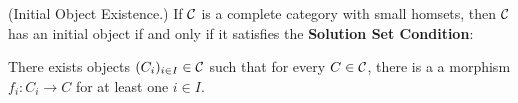     \begin{lemma}(Initial Object Existence.)
        If $\mathcal{C}$ is a complete category with small homsets, then $\mathcal{C}$ 
        has an initial object if and only if it satisfies the \textbf{Solution 
        Set Condition}: 
        \begin{center}
            \begin{minipage}{0.9\textwidth}
                There exists
                objects $(C_i)_{i \in I} \in \mathcal{C}$ such that for every $C \in \mathcal{C}$, there is a 
                a morphism $f_i: C_i \to C$ for at least one $i \in I$. 
            \end{minipage}
        \end{center}

    \end{lemma}

